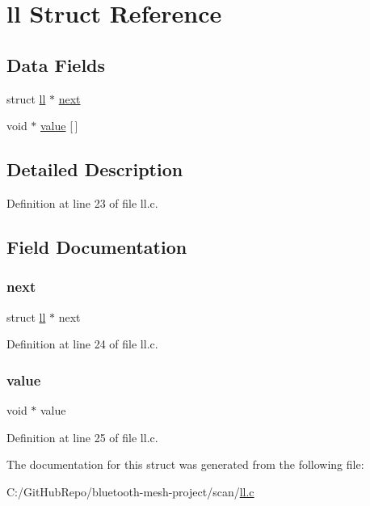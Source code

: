 \hypertarget{structll}{}\section{ll Struct Reference}
\label{structll}
\subsection*{Data Fields}
\begin{DoxyCompactItemize}
\item 
struct \mbox{\hyperlink{structll}{ll}} $\ast$ \mbox{\hyperlink{structll_a959e09163e166db03a11f78cc871d597}{next}}
\item 
void $\ast$ \mbox{\hyperlink{structll_a47b5f0a77c9e22de3535152315959226}{value}} \mbox{[}$\,$\mbox{]}
\end{DoxyCompactItemize}


\subsection{Detailed Description}


Definition at line 23 of file ll.\+c.



\subsection{Field Documentation}
\mbox{\label{structll_a959e09163e166db03a11f78cc871d597}} 
\subsubsection{\texorpdfstring{next}{next}}
{\footnotesize\ttfamily struct \mbox{\hyperlink{structll}{ll}} $\ast$ next}



Definition at line 24 of file ll.\+c.

\mbox{\label{structll_a47b5f0a77c9e22de3535152315959226}} 
\subsubsection{\texorpdfstring{value}{value}}
{\footnotesize\ttfamily void $\ast$ value}



Definition at line 25 of file ll.\+c.



The documentation for this struct was generated from the following file\+:\begin{DoxyCompactItemize}
\item 
C\+:/\+Git\+Hub\+Repo/bluetooth-\/mesh-\/project/scan/\mbox{\hyperlink{scan_2ll_8c}{ll.\+c}}\end{DoxyCompactItemize}
